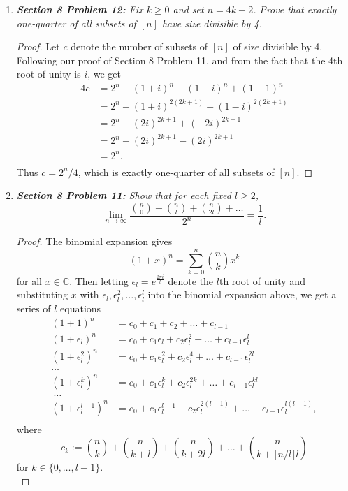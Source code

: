 \documentclass{article}
\begin{document}
\begin{enumerate}[label={\bf Q\arabic*:}]
  \item \it \textbf{Section 8 Problem 12:} Fix $k\geq0$ and set $n=4k+2$.
    Prove that exactly one-quarter of all subsets of $[n]$ have size
    divisible by 4.

    \begin{proof}
      Let $c$ denote the number of subsets of $[n]$ of size divisible by 4.
      Following our proof of Section 8 Problem 11, and from the fact that
      the 4th root of unity is $i$, we get
      \begin{align*}
        4c &=2^n +(1+i)^n +(1-i)^n +(1-1)^n\\
        &=2^n +(1+i)^{2(2k+1)} +(1-i)^{2(2k+1)}\\
        &=2^n +(2i)^{2k+1} +(-2i)^{2k+1}\\
        &=2^n +(2i)^{2k+1} -(2i)^{2k+1}\\
        &=2^n.\\
      \end{align*}
      Thus $c=2^n/4$, which is exactly one-quarter of all subsets of $[n]$.
    \end{proof}

  \item \it \textbf{Section 8 Problem 11:} Show that for each fixed
    $l\geq2$,
    \[\lim_{n\rightarrow\infty}
    \frac{\binom{n}{0}+\binom{n}{l}+\binom{n}{2l}+\ldots}{2^n}
    =\frac{1}{l}.\]

    \begin{proof}
      The binomial expansion gives
      \[(1+x)^n =\sum_{k=0}^n\binom{n}{k}x^k\]
      for all $x\in\mathbb{C}$. Then letting $\epsilon_l=e^{\frac{2\pi
      i}{l}}$ denote the $l$th root of unity and substituting $x$ with
      $\epsilon_l,\epsilon_l^2,\ldots,\epsilon_l^l$ into the binomial
      expansion above, we get a series of $l$ equations
      \begin{align*}
        (1+1)^n           &=c_0+c_1+c_2+\ldots+c_{l-1}\\
        (1+\epsilon_l)^n   &=c_0+c_1\epsilon_l  +c_2\epsilon_l^2
          +\ldots+c_{l-1}\epsilon_l^l\\
        (1+\epsilon_l^2)^n &=c_0+c_1\epsilon_l^2+c_2\epsilon_l^4
          +\ldots+c_{l-1}\epsilon_l^{2l}\\
        \ldots\\
        (1+\epsilon_l^k)^n &=c_0+c_1\epsilon_l^k+c_2\epsilon_l^{2k}
          +\ldots+c_{l-1}\epsilon_l^{kl}\\\
        \ldots\\
        (1+\epsilon_l^{l-1})^n
          &=c_0+c_1\epsilon_l^{l-1}+c_2\epsilon_l^{2(l-1)}
          +\ldots+c_{l-1}\epsilon_l^{l(l-1)},\\
      \end{align*}
      where
      \[c_k :=\binom{n}{k}+\binom{n}{k+l}+\binom{n}{k+2l}+
      \ldots+\binom{n}{k+\lfloor n/l\rfloor l}\]
      for $k\in\{0,\ldots,l-1\}$. \\


\end{proof}
\end{enumerate}
\end{document}
